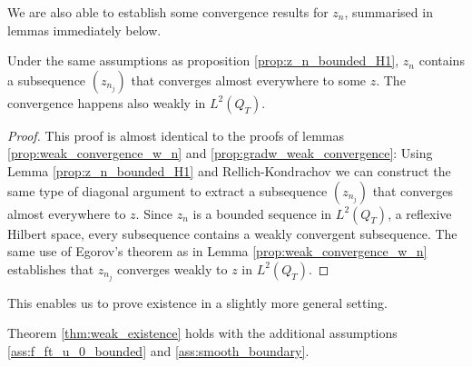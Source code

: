 \documentclass[11pt, a4paper]{article}
\begin{document}
We are also able to establish some convergence results for $z_n$, summarised in lemmas immediately below.

\begin{lemma}
\label{prop:z_n_weak_convergence}
Under the same assumptions as proposition \ref{prop:z_n_bounded_H1}, $z_n$ contains a subsequence $(z_{n_j})$ that converges almost everywhere to some $z$. The convergence happens also weakly in $L^2(Q_T)$. 
\end{lemma}

\begin{proof}
This proof is almost identical to the proofs of lemmas \ref{prop:weak_convergence_w_n} and \ref{prop:gradw_weak_convergence}: Using Lemma \ref{prop:z_n_bounded_H1} and Rellich-Kondrachov we can construct the same type of diagonal argument to extract a subsequence $(z_{n_j})$ that converges almost everywhere to $z$. Since $z_n$ is a bounded sequence in $L^2(Q_T)$, a reflexive Hilbert space, every subsequence contains a weakly convergent subsequence. The same use of Egorov's theorem as in Lemma \ref{prop:weak_convergence_w_n} establishes that $z_{n_j}$ converges weakly to $z$ in $L^2(Q_T)$.
\end{proof}


This enables us to prove existence in a slightly more general setting.
\begin{lemma}
\label{lem:weak_existence_part2}
Theorem \ref{thm:weak_existence} holds with the additional assumptions \ref{ass:f_ft_u_0_bounded} and \ref{ass:smooth_boundary}.
\end{lemma}
\end{document}
